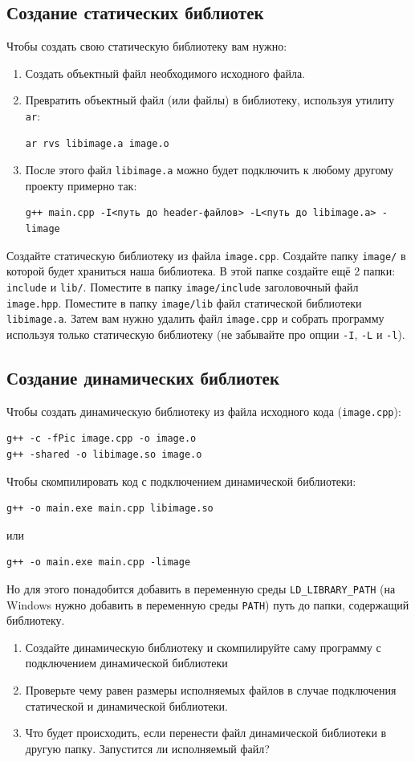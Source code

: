\documentclass{article}
\begin{document}
\subsection*{Создание статических библиотек}
Чтобы создать свою статическую библиотеку вам нужно:
\begin{enumerate}
\item Создать объектный файл необходимого исходного файла.
\item Превратить объектный файл (или файлы) в библиотеку, используя утилиту \texttt{ar}:
\begin{verbatim}
ar rvs libimage.a image.o
\end{verbatim}
\item После этого файл \texttt{libimage.a} можно будет подключить к любому другому проекту примерно так:
\begin{verbatim}
g++ main.cpp -I<путь до header-файлов> -L<путь до libimage.a> -limage
\end{verbatim}
\end{enumerate}
Создайте статическую библиотеку из файла \texttt{image.cpp}. Создайте папку \texttt{image/} в которой будет храниться наша библиотека. В этой папке создайте ещё 2 папки: \texttt{include} и \texttt{lib/}. Поместите в папку \texttt{image/include} заголовочный файл \texttt{image.hpp}. Поместите в папку \texttt{image/lib} файл статической библиотеки \texttt{libimage.a}. Затем вам нужно удалить файл \texttt{image.cpp} и собрать программу используя только статическую библиотеку (не забывайте про опции \texttt{-I}, \texttt{-L} и \texttt{-l}).


\subsection*{Создание динамических библиотек}
Чтобы создать динамическую библиотеку из файла исходного кода (\texttt{image.cpp}):
\begin{verbatim}
g++ -c -fPic image.cpp -o image.o
g++ -shared -o libimage.so image.o
\end{verbatim}
Чтобы скомпилировать код с подключением динамической библиотеки:
\begin{verbatim}
g++ -o main.exe main.cpp libimage.so
\end{verbatim}
или
\begin{verbatim}
g++ -o main.exe main.cpp -limage
\end{verbatim}
Но для этого понадобится добавить в переменную среды \texttt{LD\_LIBRARY\_PATH} (на Windows нужно добавить в переменную среды \texttt{PATH}) путь до папки, содержащий библиотеку.
\begin{enumerate}
\item Создайте динамическую библиотеку и скомпилируйте саму программу с подключением динамической библиотеки
\item Проверьте чему равен размеры исполняемых файлов в случае подключения статической и динамической библиотеки.
\item Что будет происходить, если перенести файл динамической библиотеки в другую папку. Запустится ли исполняемый файл?
\end{enumerate}
\end{document}
